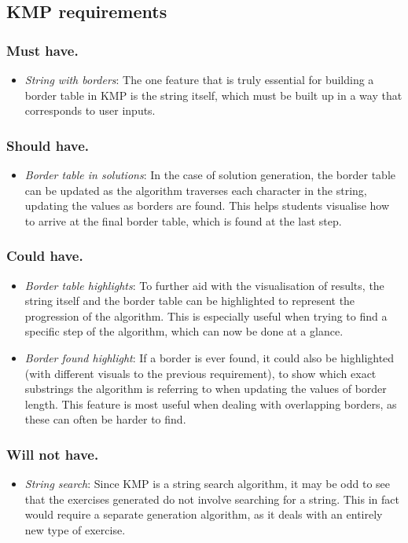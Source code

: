 \documentclass{l4proj}
\begin{document}
\subsection{KMP requirements}
\subsubsection{Must have.}
\begin{itemize}
	\item
	\emph{String with borders}: The one feature that is truly essential for building a border table in KMP is the string itself, which must be built up in a way that corresponds to user inputs.
\end{itemize}
\subsubsection{Should have.}
\begin{itemize}
	\item
	\emph{Border table in solutions}: In the case of solution generation, the border table can be updated as the algorithm traverses each character in the string, updating the values as borders are found. This helps students visualise how to arrive at the final border table, which is found at the last step.
\end{itemize}
\subsubsection{Could have.}
\begin{itemize}
	\item
	\emph{Border table highlights}: To further aid with the visualisation of results, the string itself and the border table can be highlighted to represent the progression of the algorithm. This is especially useful when trying to find a specific step of the algorithm, which can now be done at a glance.
	\item
	\emph{Border found highlight}: If a border is ever found, it could also be highlighted (with different visuals to the previous requirement), to show which exact substrings the algorithm is referring to when updating the values of border length. This feature is most useful when dealing with overlapping borders, as these can often be harder to find.
 \end{itemize}
\subsubsection{Will not have.}
\begin{itemize}
	\item
	\emph{String search}: Since KMP is a string search algorithm, it may be odd to see that the exercises generated do not involve searching for a string. This in fact would require a separate generation algorithm, as it deals with an entirely new type of exercise.
\end{itemize}
\end{document}
